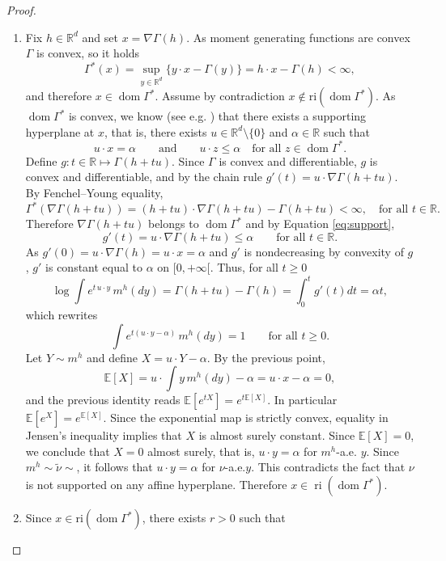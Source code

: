 \documentclass[reqno, a4paper]{amsart}
\DeclareMathOperator{\ri}{ri}
\theoremstyle{plain}
\theoremstyle{definition}
\theoremstyle{remark}
\numberwithin{equation}{section}
\numberwithin{theorem}{section}
\newcommand{\R}{\mathbb{R}}
\newcommand{\E}{\mathbb{E}}
\newcommand{\dom}{\operatorname{dom}}
\begin{document}
\begin{proof}
\begin{enumerate}
			\item[(b)] Fix $h\in\R^d$ and set $x=\nabla\Gamma(h)$. As moment generating functions are convex $\Gamma$ is convex, so it holds
			\[
			\Gamma^*(x)=\sup_{y\in\R^d}\{y\cdot x-\Gamma(y)\} = h\cdot x-\Gamma(h)<\infty,
			\]
			and therefore $x\in\dom\Gamma^*$. Assume by contradiction
			$x\notin \mathrm{ri}(\dom\Gamma^*)$. As $\dom\Gamma^*$ is convex, we know (see e.g. \cite[Lemma 4.2.1]{HiLe93}) that there exists a supporting
			hyperplane at $x$, that is, there exists $u\in\R^d\setminus\{0\}$ and $\alpha\in\R$ such that
			\begin{equation}\label{eq:support}
				u\cdot x=\alpha \qquad \text{and} \qquad u\cdot z\le \alpha \quad\text{for all } z \in\dom\Gamma^*.
			\end{equation}
			Define $g : t \in \R \mapsto \Gamma(h+t u).$ Since \(\Gamma\) is convex and differentiable, \(g\) is convex and differentiable, and by the chain rule $	g'(t)=u\cdot \nabla \Gamma(h+t u).$ By Fenchel--Young equality,
			\[
			\Gamma^*(\nabla\Gamma(h+t u))
			=(h+t u)\cdot \nabla\Gamma(h+t u)-\Gamma(h+t u)<\infty, \quad \text{for all } t \in \R.
			\]
			Therefore \(\nabla\Gamma(h+t u)\) belongs to \(\dom\Gamma^*\) and by Equation \eqref{eq:support},
			\[
			g'(t)=u\cdot \nabla\Gamma(h+t u)\le \alpha
			\qquad\text{for all } t\in\R.
			\]
			As $g'(0)=u\cdot \nabla\Gamma(h)=u\cdot x=\alpha$ and \(g'\) is nondecreasing by convexity of $g$, $g'$ is constant equal to $\alpha$ on $[0,+\infty[$.
			Thus, for all $t \geq 0$
			\[
			\log\int e^{t\,u\cdot y}\,m^h(dy) = \Gamma(h+t u)-\Gamma(h)= \int^t_0 g'(t) dt = \alpha t,
			\]
			which rewrites
			\[
			\int e^{t(u\cdot y-\alpha)}\,m^h(dy)=1
			\qquad\text{for all } t\ge 0.
			\]
			Let \(Y\sim m^h\) and define \(X=u\cdot Y-\alpha\). By the previous point,
			$$\E[X]	=u\cdot \int y\,m^h(dy)-\alpha = u\cdot x-\alpha =0,$$
			and the previous identity reads $\E[e^{tX}]=e^{t\E[X]}.$ In particular $\E[e^{X}]=e^{\E[X]}$. 	Since the exponential map is strictly convex, equality in Jensen's inequality implies that \(X\) is almost surely constant. Since \(\E[X]=0\), we conclude that \(X=0\) almost surely, that is,	$u\cdot y=\alpha$ for $m^h$-a.e. $y$. Since \(m^h\sim \tilde\nu \sim\), it follows that $u\cdot y=\alpha$ for $\nu$-a.e.$y$. This contradicts the fact that \(\nu\) is not supported on any affine hyperplane. Therefore $	x\in \ri(\dom\Gamma^*).$
			\item[(c)] Since $x\in \mathrm{ri}(\dom\Gamma^*)$, there exists $r>0$ such that
			\begin{equation}\label{eq:ri_ball_affine}

\end{equation}
\end{enumerate}
\end{proof}
\end{document}

